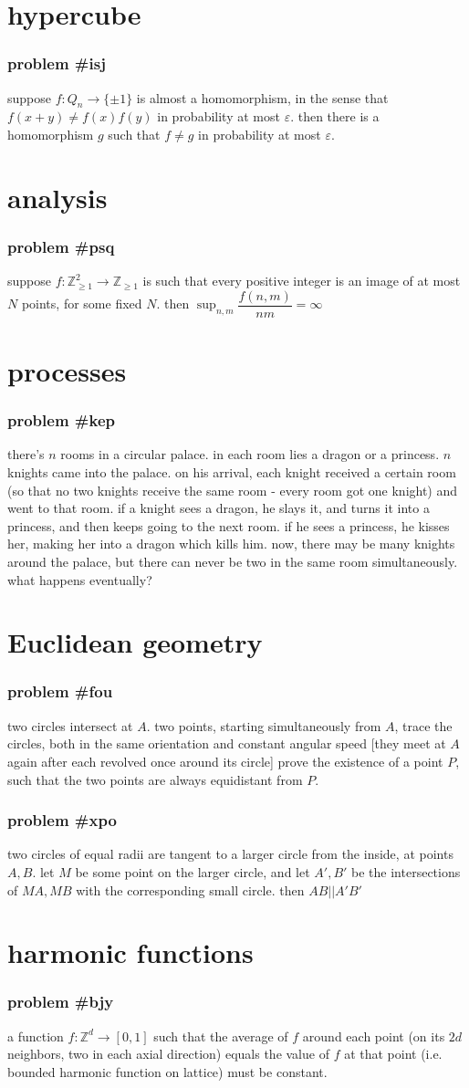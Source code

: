 \documentclass{article}
\newcommand{\problem}[1]{\subsubsection*{\textbf{problem \##1}}}
\newcommand{\chapter}[1]{\section*{#1}}
\newcommand{\Z}{\mathbb{Z}}
\newcommand{\Zpv}{\mathbb{Z}_{\ge1}}
\begin{document}
\chapter{hypercube}
\problem{isj} suppose $f:Q_n\to \{\pm1\}$ is almost a homomorphism, in the sense that $f(x+y)\neq f(x)f(y)$ in probability at most $\varepsilon$. then there is a homomorphism $g$ such that $f\neq g$ in probability at most $\varepsilon$.
\chapter{analysis}
\problem{psq} suppose $f:\Zpv^2\to\Zpv$ is such that every positive integer is an image of at most $N$ points, for some fixed $N$. then $\displaystyle{\sup_{n,m}} \dfrac{f(n,m)}{nm}=\infty$
\chapter{processes}
\problem{kep} there's $n$ rooms in a circular palace. in each room lies a dragon or a princess. $n$ knights came into the palace. on his arrival, each knight received a certain room (so that no two knights receive the same room - every room got one knight) and went to that room. if a knight sees a dragon, he slays it, and turns it into a princess, and then keeps going to the next room. if he sees a princess, he kisses her, making her into a dragon which kills him. now, there may be many knights around the palace, but there can never be two in the same room simultaneously. what happens eventually?
\chapter{Euclidean geometry}
\problem{fou} two circles intersect at $A$. two points, starting simultaneously from $A$, trace the circles, both in the same orientation and constant angular speed [they meet at $A$ again after each revolved once around its
circle] prove the existence of a point $P$, such that the two points are always equidistant from $P$.
\problem{xpo} two circles of equal radii are tangent to a larger circle from the inside, at points $A,B$. let $M$ be some point on the larger circle, and let $A',B'$ be the intersections of $MA,MB$ with the corresponding small circle. then $AB||A'B'$
\chapter{harmonic functions}
\problem{bjy} a function $f:\Z^d\to[0,1]$ such that the average of $f$ around each point (on its $2d$ neighbors, two in each axial direction) equals the value of $f$ at that point (i.e. bounded harmonic function on lattice) must be constant.
\end{document}
